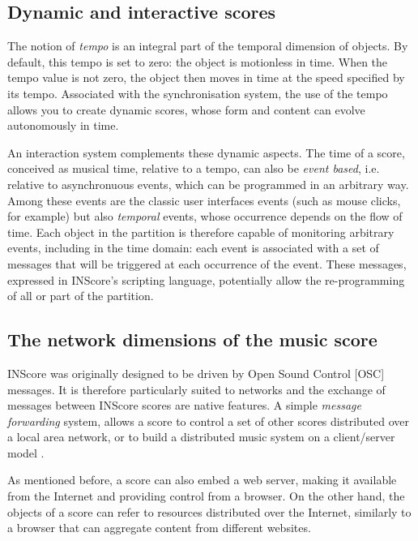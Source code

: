 \documentclass{article}
\begin{document}
\subsection{Dynamic and interactive scores}

The notion of \emph{tempo} is an integral part of the temporal dimension of objects. By default, this tempo is set to zero: the object is motionless in time. When the tempo value is not zero, the object then moves in time at the speed specified by its tempo. Associated with the synchronisation system, the use of the tempo allows you to create dynamic scores, whose form and content can evolve autonomously in time.

An interaction system complements these dynamic aspects. The time of a score, conceived as musical time, relative to a tempo, can also be \emph{event based}, i.e. relative to asynchronuous events, which can be programmed in an arbitrary way. Among these events are the classic user interfaces events (such as mouse clicks, for example) but also \emph{temporal} events, whose occurrence depends on the flow of time. Each object in the partition is therefore capable of monitoring arbitrary events, including in the time domain: each event is associated with a set of messages that will be triggered at each occurrence of the event. These messages, expressed in INScore's scripting language, potentially allow the re-programming of all or part of the partition.

\subsection{The network dimensions of the music score}

INScore was originally designed to be driven by Open Sound Control [OSC] messages. It is therefore particularly suited to networks and the exchange of messages between INScore scores are native features. A simple \emph{message forwarding} system, allows a score to control a set of other scores distributed over a local area network, or to build a distributed music system on a client/server model \cite{Zagorac_tenor2018}.

As mentioned before, a score can also embed a web server, making it available from the Internet and providing control from a browser. On the other hand, the objects of a score can refer to resources distributed over the Internet, similarly to a browser that can aggregate content from different websites.
\end{document}
